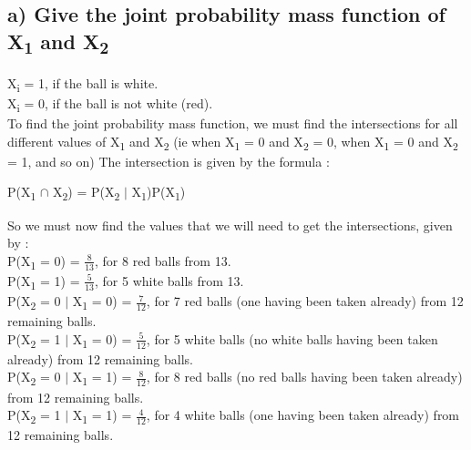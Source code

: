 \documentclass{report}
\begin{document}
		\subsection*{a) Give the joint probability mass function of X\textsubscript{1} and X\textsubscript{2}}
		X\textsubscript{i} = 1, if the ball is white.\\
		X\textsubscript{i} = 0, if the ball is not white (red).\\
		To find the joint probability mass function, we must find the intersections for all different values of X\textsubscript{1} and X\textsubscript{2} (ie when X\textsubscript{1} = 0 and X\textsubscript{2} = 0, when X\textsubscript{1} = 0 and X\textsubscript{2} = 1, and so on)
		The intersection is given by the formula : 
		\begin{center}
			P(X\textsubscript{1} $\cap$ X\textsubscript{2}) = P(X\textsubscript{2} $\vert$ X\textsubscript{1})P(X\textsubscript{1})
		\end{center}
		So we must now find the values that we will need to get the intersections, given by :\\
		P(X\textsubscript{1} = 0) = $\frac{8}{13}$, for 8 red balls from 13.\\
		P(X\textsubscript{1} = 1) = $\frac{5}{13}$, for 5 white balls from 13.\\
		P(X\textsubscript{2} = 0 $\vert$ X\textsubscript{1} = 0) = $\frac{7}{12}$, for 7 red balls (one having been taken already) from 12 remaining balls.\\
		P(X\textsubscript{2} = 1 $\vert$ X\textsubscript{1} = 0) = $\frac{5}{12}$, for 5 white balls (no white balls having been taken already) from 12 remaining balls.\\
		P(X\textsubscript{2} = 0 $\vert$ X\textsubscript{1} = 1) = $\frac{8}{12}$, for 8 red balls (no red balls having been taken already) from 12 remaining balls.\\
		P(X\textsubscript{2} = 1 $\vert$ X\textsubscript{1} = 1) = $\frac{4}{12}$, for 4 white balls (one having been taken already) from 12 remaining balls.\\\\
		
\end{document}
